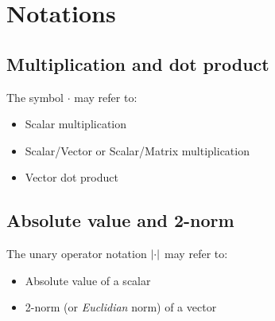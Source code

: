 \section{Notations}
\subsection{Multiplication and dot product}
The symbol $\cdot$ may refer to:
\begin{itemize}
\item Scalar multiplication
\item Scalar/Vector or Scalar/Matrix multiplication
\item Vector dot product
\end{itemize}

\subsection{Absolute value and 2-norm}
The unary operator notation $\abs{\cdot}$ may refer to:
\begin{itemize}
\item Absolute value of a scalar
\item 2-norm (or \emph{Euclidian} norm) of a vector
\end{itemize}

